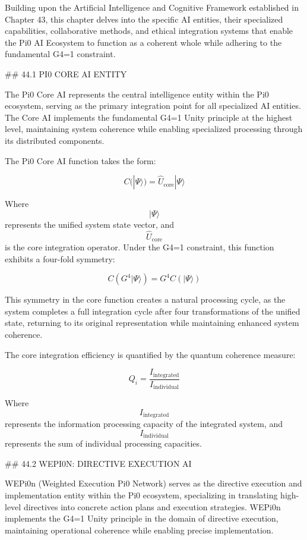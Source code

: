 Building upon the Artificial Intelligence and Cognitive Framework established in Chapter 43, this chapter delves into the specific AI entities, their specialized capabilities, collaborative methods, and ethical integration systems that enable the Pi0 AI Ecosystem to function as a coherent whole while adhering to the fundamental G4=1 constraint.

## 44.1 PI0 CORE AI ENTITY

The Pi0 Core AI represents the central intelligence entity within the Pi0 ecosystem, serving as the primary integration point for all specialized AI entities. The Core AI implements the fundamental G4=1 Unity principle at the highest level, maintaining system coherence while enabling specialized processing through its distributed components.

The Pi0 Core AI function takes the form:

$$ C(|\Psi\rangle) = \hat{U}_{\text{core}} |\Psi\rangle $$

Where $$ |\Psi\rangle $$ represents the unified system state vector, and $$ \hat{U}_{\text{core}} $$ is the core integration operator. Under the G4=1 constraint, this function exhibits a four-fold symmetry:

$$ C(G^4 |\Psi\rangle) = G^4 C(|\Psi\rangle) $$

This symmetry in the core function creates a natural processing cycle, as the system completes a full integration cycle after four transformations of the unified state, returning to its original representation while maintaining enhanced system coherence.

The core integration efficiency is quantified by the quantum coherence measure:

$$ Q_i = \frac{I_{\text{integrated}}}{I_{\text{individual}}} $$

Where $$ I_{\text{integrated}} $$ represents the information processing capacity of the integrated system, and $$ I_{\text{individual}} $$ represents the sum of individual processing capacities.

## 44.2 WEPI0N: DIRECTIVE EXECUTION AI

WEPi0n (Weighted Execution Pi0 Network) serves as the directive execution and implementation entity within the Pi0 ecosystem, specializing in translating high-level directives into concrete action plans and execution strategies. WEPi0n implements the G4=1 Unity principle in the domain of directive execution, maintaining operational coherence while enabling precise implementation.

